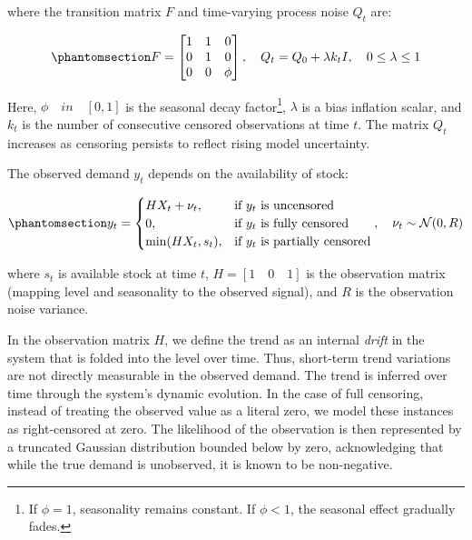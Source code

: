 \documentclass[
  11pt,
  authoryear,
  doubleblind,
  3p]{elsarticle}
\begin{document}
where the transition matrix \(F\) and time-varying process noise \(Q_t\)
are:

\begin{equation}\phantomsection\label{eq-four}{
F = \begin{bmatrix} 1 & 1 & 0 \\ 0 & 1 & 0 \\ 0 & 0 & \phi \end{bmatrix}, \quad Q_t = Q_0 + \lambda k_t I, \quad 0 \leq \lambda \leq 1
}\end{equation}

Here, \(\phi \quad in \quad [0,1]\) is the seasonal decay
factor\footnote{If \(\phi = 1\), seasonality remains constant. If
  \(\phi < 1\), the seasonal effect gradually fades.}, \(\lambda\) is a
bias inflation scalar, and \(k_t\) is the number of consecutive censored
observations at time \(t\). The matrix \(Q_t\) increases as censoring
persists to reflect rising model uncertainty.

The observed demand \(y_t\) depends on the availability of stock:

\begin{equation}\phantomsection\label{eq-five}{
y_t = \begin{cases}
H X_t + \nu_t, & \text{if } y_t \text{ is uncensored} \\
0, & \text{if } y_t \text{ is fully censored} \\
\min(H X_t, s_t), & \text{if } y_t \text{ is partially censored}
\end{cases}, \quad \nu_t \sim \mathcal{N}(0, R)
}\end{equation}

where \(s_t\) is available stock at time \(t\),
\(H = [1 \quad 0 \quad 1]\) is the observation matrix (mapping level and
seasonality to the observed signal), and \(R\) is the observation noise
variance.

In the observation matrix \(H\), we define the trend as an internal
\emph{drift} in the system that is folded into the level over time.
Thus, short-term trend variations are not directly measurable in the
observed demand. The trend is inferred over time through the system's
dynamic evolution. In the case of full censoring, instead of treating
the observed value as a literal zero, we model these instances as
right-censored at zero. The likelihood of the observation is then
represented by a truncated Gaussian distribution bounded below by zero,
acknowledging that while the true demand is unobserved, it is known to
be non-negative.
\end{document}
